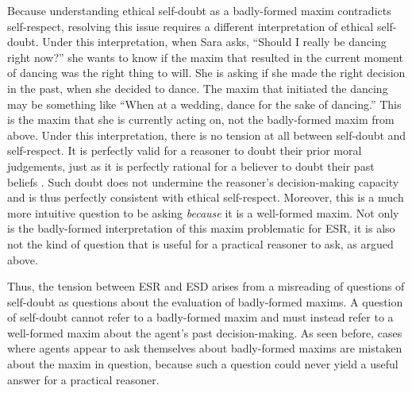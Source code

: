 \begin{isabellebody}
\begin{isamarkuptext}
Because understanding ethical self-doubt as a badly-formed maxim contradicts self-respect, resolving this issue requires a 
different interpretation of ethical self-doubt. Under this interpretation, 
when Sara asks, ``Should I really be dancing right now?'' she wants to know if the maxim that 
resulted in the current moment of dancing was the right thing to will. She is 
asking if she made the right decision in the past, when she decided to dance. The maxim that initiated 
the dancing may be something like ``When at a wedding, dance for the sake of dancing.'' This is the maxim 
that she is currently acting on, not the badly-formed maxim  from above. Under this interpretation, 
there is no tension at all between self-doubt and self-respect. It is perfectly valid for a reasoner 
to doubt their prior moral judgements, just as it is perfectly rational for a believer to doubt their 
past beliefs \cite[3-4]{christensen}. Such doubt does not undermine the reasoner's decision-making 
capacity and is thus perfectly consistent with ethical self-respect. Moreover, this is a much more 
intuitive question to be asking \emph{because} it is a well-formed maxim. Not only is the badly-formed
interpretation of this maxim problematic for ESR, it is also not the kind of question that is useful for a practical
reasoner to ask, as argued above.

Thus, the tension between ESR and ESD arises from a misreading of questions of self-doubt as questions about 
the evaluation of badly-formed maxims. A question of self-doubt cannot refer to a badly-formed maxim and must 
instead refer to a well-formed maxim about the agent's past decision-making. As seen before, cases where 
agents appear to ask themselves about badly-formed maxims are mistaken about the maxim in question, because 
such a question could never yield a useful answer for a practical reasoner. 


\end{isamarkuptext}
\end{isabellebody}

